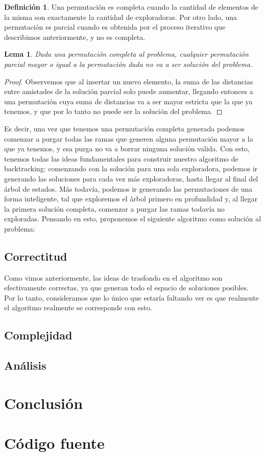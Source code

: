 \documentclass{article}
\newtheorem{lemma}{Lema}[theorem]
\theoremstyle{definition}
\newtheorem{definition}{Definición}[section]
\theoremstyle{remark}
\begin{document}
\begin{definition}
Una permutación es completa cuando la cantidad de elementos de la misma son exactamente la cantidad de exploradoras. Por otro lado, una permutación es parcial cuando es obtenida por el proceso iterativo que describimos anteriormente, y no es completa.
\end{definition}

\begin{lemma}
Dada una permutación completa al problema, cualquier permutación parcial mayor o igual a la permutación dada no va a ser solución del problema.
\end{lemma}

\begin{proof}
Observemos que al insertar un nuevo elemento, la suma de las distancias entre amistades de la solución parcial solo puede aumentar, llegando entonces a una permutación cuya suma de distancias va a ser mayor estricta que la que ya tenemos, y que por lo tanto no puede ser la solución del problema.
\end{proof}

Es decir, una vez que tenemos una permutación completa generada podemos comenzar a purgar todas las ramas que generen alguna permutación mayor a la que ya tenemos, y esa purga no va a borrar ninguna solución valida. Con esto, tenemos todas las ideas fundamentales para construir nuestro algoritmo de backtracking: comenzando con la solución para una sola exploradora, podemos ir generando las soluciones para cada vez más exploradoras, hasta llegar al final del árbol de estados. Más todavía, podemos ir generando las permutaciones de una forma inteligente, tal que exploremos el árbol primero en profundidad y, al llegar la primera solución completa, comenzar a purgar las ramas todavía no exploradas. Pensando en esto, proponemos el siguiente algoritmo como solución al problema:


\subsection{Correctitud}

Como vimos anteriormente, las ideas de trasfondo en el algoritmo son efectivamente correctas, ya que generan todo el espacio de soluciones posibles. Por lo tanto, consideramos que lo único que estaría faltando ver es que realmente el algoritmo realmente se corresponde con esto.

\subsection{Complejidad}

\subsection{Análisis}

\section{Conclusión}

\section{Código fuente}
\end{document}
